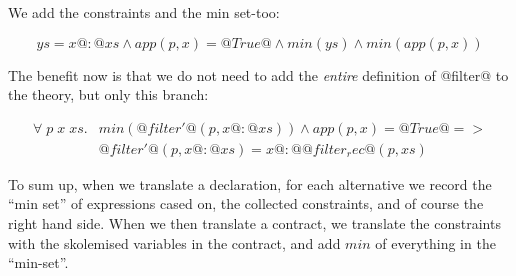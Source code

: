 We add the constraints and the min set-too:

$$ys = x@:@xs \land app(p,x) = @True@ \land min(ys) \land min(app(p,x)) $$

The benefit now is that we do not need to add the \emph{entire}
definition of @filter@ to the theory, but only this branch:

\[\begin{array}{rl}
\forall \; p \; x \; xs . & min(@filter'@(p,x@:@xs)) \land app(p,x) = @True@ => \\
                          & @filter'@(p,x@:@xs) = x @:@ @filter_rec@(p,xs)
\end{array}\]

To sum up, when we translate a declaration, for each alternative we
record the ``min set'' of expressions cased on, the collected
constraints, and of course the right hand side. When we then translate
a contract, we translate the constraints with the skolemised variables
in the contract, and add $min$ of everything in the ``min-set''.
